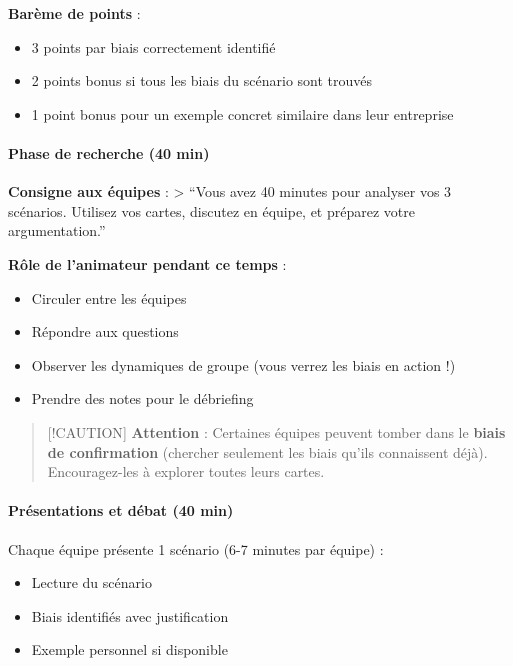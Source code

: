 \documentclass[
]{article}
\providecommand{\tightlist}{%
  \setlength{\itemsep}{0pt}\setlength{\parskip}{0pt}}
\begin{document}
\textbf{Barème de points} :

\begin{itemize}
\tightlist
\item
  3 points par biais correctement identifié
\item
  2 points bonus si tous les biais du scénario sont trouvés
\item
  1 point bonus pour un exemple concret similaire dans leur entreprise
\end{itemize}

\paragraph{Phase de recherche (40 min)}\label{phase-de-recherche-40-min}

\textbf{Consigne aux équipes} : \textgreater{} ``Vous avez 40 minutes
pour analyser vos 3 scénarios. Utilisez vos cartes, discutez en équipe,
et préparez votre argumentation.''

\textbf{Rôle de l'animateur pendant ce temps} :

\begin{itemize}
\tightlist
\item
  Circuler entre les équipes
\item
  Répondre aux questions
\item
  Observer les dynamiques de groupe (vous verrez les biais en action !)
\item
  Prendre des notes pour le débriefing
\end{itemize}

\begin{quote}
{[}!CAUTION{]} \textbf{Attention} : Certaines équipes peuvent tomber
dans le \textbf{biais de confirmation} (chercher seulement les biais
qu'ils connaissent déjà). Encouragez-les à explorer toutes leurs cartes.
\end{quote}

\paragraph{Présentations et débat (40
min)}\label{pruxe9sentations-et-duxe9bat-40-min}

Chaque équipe présente 1 scénario (6-7 minutes par équipe) :

\begin{itemize}
\tightlist
\item
  Lecture du scénario
\item
  Biais identifiés avec justification
\item
  Exemple personnel si disponible
\end{itemize}
\end{document}
